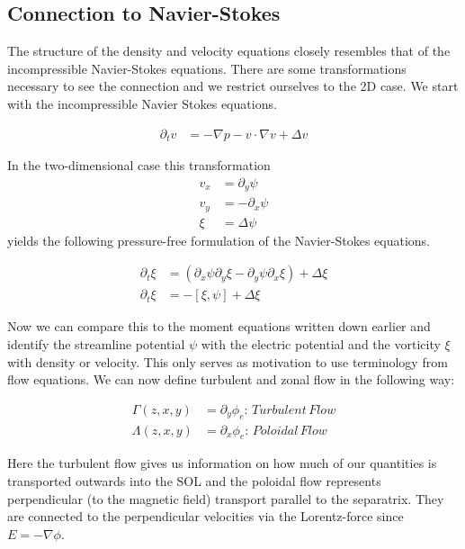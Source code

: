 \documentclass[master.tex]{subfiles}
\begin{document}
\subsection{Connection to Navier-Stokes}
\label{sec:connection_navier_stokes}

The structure of the density and velocity equations closely resembles that of the incompressible Navier-Stokes equations.
There are some transformations necessary to see the connection and we restrict ourselves to the 2D case. We start with the incompressible Navier Stokes equations.

\begin{align}
    \partial_t v &= - \nabla p - v \cdot \nabla v + \Delta v
\end{align}

In the two-dimensional case this transformation
\begin{align}
    v_x &= \partial_y \psi \\
    v_y &= -\partial_x \psi \\
    \xi &= \Delta \psi
\end{align}
yields the following pressure-free formulation of the Navier-Stokes equations.

\begin{align}
    \partial_t \xi &= \left( \partial_x \psi \partial_y \xi - \partial_y \psi \partial_x \xi  \right) + \Delta \xi\\
    \partial_t \xi &= - \left[\xi, \psi\right] + \Delta \xi
\end{align}

Now we can compare this to the moment equations written down earlier and identify the streamline potential $\psi$ with the electric potential and the vorticity $\xi$ with density or velocity. This only serves as motivation to use terminology from flow equations. We can now define turbulent and zonal flow in the following way:

\begin{align}
    \Gamma(z,x,y) &= \partial_y \phi_e :\, Turbulent\,Flow\\
    \Lambda(z,x,y) &= \partial_x \phi_e :\, Poloidal\,Flow
\end{align}

Here the turbulent flow gives us information on how much of our quantities is transported outwards into the \ac{SOL} and the poloidal flow represents perpendicular (to the magnetic field) transport parallel to the separatrix. They are connected to the perpendicular velocities via the Lorentz-force since $E = -\nabla \phi$.
\end{document}
